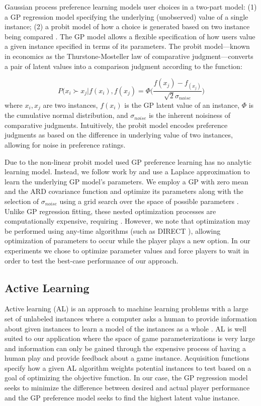 \documentclass[letterpaper]{article}
\begin{document}
Gaussian process preference learning models user choices in a two-part model: (1) a GP regression model specifying the underlying  (unobserved) value of a single instance; (2) a probit model of how a choice is generated based on two instance being compared \cite{chu2005}. The GP model allows a flexible specification of how users value a given instance specified in terms of its parameters. The probit model---known in economics as the Thurstone-Mosteller law of comparative judgment---converts a pair of latent values into a comparison judgment according to the function:

$$ P( x_i \succ x_j | f(x_i), f(x_j) = \Phi\bigg( \frac{f(x_j) - f_(x_j)}{\sqrt{2} \sigma_{noise}} \bigg) $$
where $x_i, x_j$ are two instances, $f(x_i)$ is the GP latent value of an instance, $\Phi$ is the cumulative normal distribution, and $\sigma_{noise}$ is the inherent noisiness of comparative judgments. Intuitively, the probit model encodes preference judgments as based on the difference in underlying value of two instances, allowing for noise in preference ratings. 

Due to the non-linear probit model used GP preference learning has no analytic learning model. Instead, we follow work by \cite{chu2005} and use a Laplace approximation to learn the underlying GP model's parameters. We employ a GP with zero mean and the ARD covariance function and optimize its parameters along with the selection of $\sigma_{noise}$ using a grid search over the space of possible parameters . Unlike GP regression fitting, these nested optimization processes are computationally expensive, requiring . However, we note that optimization may be performed using any-time algorithms (such as DIRECT \cite{jones1993:direct}), allowing optimization of parameters to occur while the player plays a new option. In our experiments we chose to optimize parameter values and force players to wait in order to test the best-case performance of our approach.


\subsection{Active Learning}
Active learning (AL) is an approach to machine learning problems with a large set of unlabeled instances where a computer asks a human to provide information about given instances to learn a model of the instances as a whole \cite{settles2012:al-book}. AL is well suited to our application where the space of game parameterizations is very large and information can only be gained through the expensive process of having a human play and provide feedback about a game instance. Acquisition functions specify how a given AL algorithm weights potential instances to test based on a goal of optimizing the objective function. In our case, the GP regression model seeks to minimize the difference between desired and actual player performance and the GP preference model seeks to find the highest latent value instance.
\end{document}
